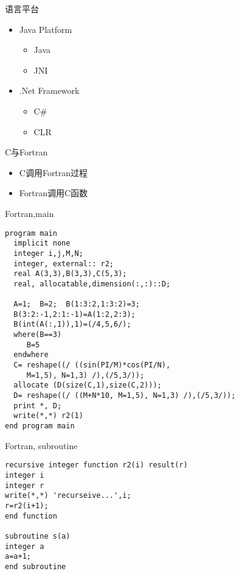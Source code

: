 \begin{frame}{语言平台}
\begin{center}
\end{center}
\begin{itemize}
\item Java Platform
\begin{itemize}
\item Java
\item JNI
\end{itemize}
\item .Net Framework
\begin{itemize}
\item C\#
\item CLR
\end{itemize}
\end{itemize}
\end{frame}



\begin{frame}{C与Fortran}
\begin{itemize}
\item C调用Fortran过程
\item Fortran调用C函数
\end{itemize}
\end{frame}

\def\lstlistingname{例}
\begin{frame}[containsverbatim]{Fortran,main}
\lstset{language=fortran}
\begin{lstlisting}
program main
  implicit none
  integer i,j,M,N;
  integer, external:: r2;
  real A(3,3),B(3,3),C(5,3);
  real, allocatable,dimension(:,:)::D;

  A=1;  B=2;  B(1:3:2,1:3:2)=3;
  B(3:2:-1,2:1:-1)=A(1:2,2:3);
  B(int(A(:,1)),1)=(/4,5,6/);
  where(B==3)
     B=5
  endwhere
  C= reshape((/ ((sin(PI/M)*cos(PI/N), 
     M=1,5), N=1,3) /),(/5,3/));
  allocate (D(size(C,1),size(C,2)));
  D= reshape((/ ((M+N*10, M=1,5), N=1,3) /),(/5,3/));
  print *, D;
  write(*,*) r2(1)
end program main
\end{lstlisting}
\end{frame}

\begin{frame}[containsverbatim]{Fortran, subroutine}
\lstset{language=fortran}
\begin{lstlisting}
recursive integer function r2(i) result(r)
integer i
integer r
write(*,*) 'recurseive...',i;
r=r2(i+1);
end function

subroutine s(a)
integer a
a=a+1;
end subroutine
\end{lstlisting}
\end{frame}

